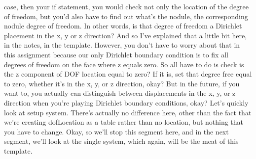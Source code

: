 \documentclass[10pt]{article}
\begin{document}
case, then your if statement, you would check not only the location of the degree of freedom, but you'd also have to find out what's the nodule, the corresponding nodule degree of freedom. In other words, is that degree of freedom a Dirichlet placement in the x, y or z direction? And so I've explained that a little bit here, in the notes, in the template. However, you don't have to worry about that in this assignment because our only Dirichlet boundary condition is to fix all degrees of freedom on the face where z equals zero. So all have to do is check is the z component of DOF location equal to zero? If it is, set that degree free equal to zero, whether it's in the x, y, or z direction, okay? But in the future, if you want to, you actually can distinguish between displacements in the x, y, or z direction when you're playing Dirichlet boundary conditions, okay? Let's quickly look at setup system. There's actually no difference here, other than the fact that we're creating dofLocation as a table rather than no location, but nothing that you have to change. Okay, so we'll stop this segment here, and in the next segment, we'll look at the single system, which again, will be the meat of this template.
\end{document}
